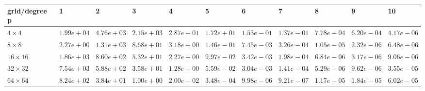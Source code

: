 \begin{tabular}{lllllllllll}
\hline
 grid/degree p   & 1          & 2          & 3          & 4          & 5          & 6          & 7          & 8          & 9          & 10         \\
\hline
 $4 \times 4$    & $1.99e+04$ & $4.76e+03$ & $2.15e+03$ & $2.87e+01$ & $1.72e+01$ & $1.53e-01$ & $1.37e-01$ & $7.78e-04$ & $6.20e-04$ & $4.17e-06$ \\
 $8 \times 8$    & $2.27e+00$ & $1.31e+03$ & $8.68e+01$ & $3.18e+00$ & $1.46e-01$ & $7.45e-03$ & $3.26e-04$ & $1.05e-05$ & $2.32e-06$ & $6.48e-06$ \\
 $16 \times 16$  & $1.86e+03$ & $8.60e+02$ & $5.32e+01$ & $2.27e+00$ & $9.97e-02$ & $3.42e-03$ & $1.98e-04$ & $6.84e-06$ & $3.17e-06$ & $9.06e-06$ \\
 $32 \times 32$  & $7.54e+03$ & $5.88e+02$ & $3.58e+01$ & $1.28e+00$ & $5.59e-02$ & $3.04e-03$ & $1.41e-04$ & $5.29e-06$ & $9.62e-06$ & $3.55e-05$ \\
 $64 \times 64$  & $8.24e+02$ & $3.84e+01$ & $1.00e+00$ & $2.00e-02$ & $3.48e-04$ & $9.98e-06$ & $9.21e-07$ & $1.17e-05$ & $1.84e-05$ & $6.02e-05$ \\
\hline
\end{tabular}